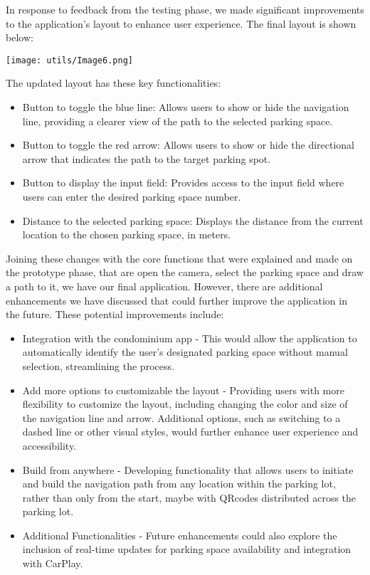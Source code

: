 \documentclass[11pt]{article}
\begin{document}
\begin{multicols}{2}
    In response to feedback from the testing phase, we made significant improvements to the application's layout to enhance user experience. The final layout is shown below:

    \vspace{0,5cm}
    {
	    \centering
	    \texttt{[image: utils/Image6.png]}
    }
    \vspace{0,5cm}

    The updated layout has these key functionalities:
    \begin{itemize}
		\item Button to toggle the blue line: Allows users to show or hide the navigation line, providing a clearer view of the path to the selected parking space.
		\item Button to toggle the red arrow: Allows users to show or hide the directional arrow that indicates the path to the target parking spot.
		\item Button to display the input field: Provides access to the input field where users can enter the desired parking space number.
		\item Distance to the selected parking space: Displays the distance from the current location to the chosen parking space, in meters.
    \end{itemize}

    Joining these changes with the core functions that were explained and made on the prototype phase, that are open the camera, select the parking space and draw a path to it, we have our final application. However, there are additional enhancements we have discussed that could further improve the application in the future. These potential improvements include:

    \begin{itemize}
		\item Integration with the condominium app - This would allow the application to automatically identify the user’s designated parking space without manual selection, streamlining the process.
		\item Add more options to customizable the layout -  Providing users with more flexibility to customize the layout, including changing the color and size of the navigation line and arrow. Additional options, such as switching to a dashed line or other visual styles, would further enhance user experience and accessibility.
		\item Build from anywhere - Developing functionality that allows users to initiate and build the navigation path from any location within the parking lot, rather than only from the start, maybe with QRcodes distributed across the parking lot.
		\item Additional Functionalities - Future enhancements could also explore the inclusion of real-time updates for parking space availability and integration with CarPlay.
    \end{itemize}


\end{multicols}
\end{document}
